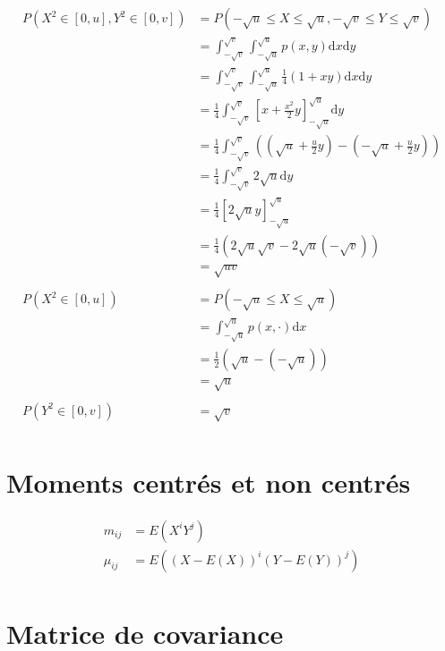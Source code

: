 \documentclass{article}
\newcommand{\dx}{\mathrm{d}x}
\newcommand{\dy}{\mathrm{d}y}
\begin{document}
\begin{align*}
	P(X^2\in [0, u], Y^2\in [0, v]) &= P(-\sqrt{u} \le X \le  \sqrt{u}, -\sqrt{v} \le Y\le \sqrt{v}  ) \\
					&= \int_{-\sqrt{v}}^{\sqrt{v} } \int_{-\sqrt{u} }^{\sqrt{u} } p(x, y) \dx \dy\\
					&= \int_{-\sqrt{v} }^{\sqrt{v} } \int_{-\sqrt{u} }^{\sqrt{u} } \frac{1}{4} (1+xy) \dx \dy \\
					&= \frac{1}{4} \int_{-\sqrt{v} }^{\sqrt{v} } \left[ x + \frac{x^2}{2} y \right]_{-\sqrt{u} }^{\sqrt{u} } \dy \\
					&= \frac{1}{4} \int_{-\sqrt{v} }^{\sqrt{v} } \left( \left( \sqrt{u} + \frac{u}{2} y \right) - \left( -\sqrt{u} + \frac{u}{2}y \right)   \right)  \\
					&= \frac{1}{4} \int_{-\sqrt{v} }^{\sqrt{v} } 2 \sqrt{u}  \dy \\
					&= \frac{1}{4} \left[ 2\sqrt{u} y \right]_{-\sqrt{u} }^{\sqrt{u} } \\
					&= \frac{1}{4} \left( 2\sqrt{u} \sqrt{v} - 2 \sqrt{u}(- \sqrt{v})  \right)  \\
					&= \sqrt{uv}  \\
					\\
	P(X^2\in [0, u]) &= P(-\sqrt{u} \le X \le \sqrt{u} ) \\
			 &= \int_{-\sqrt{u} }^{\sqrt{u} } p(x,  \cdot ) \dx \\
			 &= \frac{1}{2} (\sqrt{u} - (-\sqrt{u} )) \\
			 &=  \sqrt{u}  \\
			 \\
	 P(Y^2\in [0, v]) &=  \sqrt{v}  \\
\end{align*}


\section{Moments centrés et non centrés}

\begin{align*}
	m_{ij} &= E(X^{i}Y^{j}) \\
	\mu_{ij} &= E((X-E(X))^i(Y-E(Y))^j) \\
\end{align*}


\section{Matrice de covariance}
\end{document}
